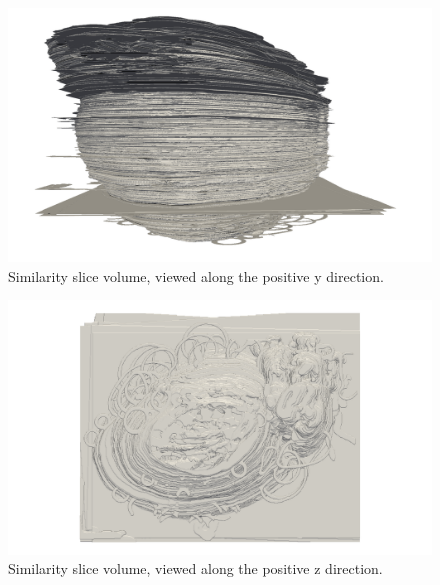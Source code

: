 	\begin{figure}
	  \centering
	  \includegraphics[width=0.9\textheight]{Ch7/Figs/Rat28/contours/whole_positive_y_size}
	  \caption{Similarity slice volume, viewed along the positive y direction.}
	  \label{fig:positive_y_similarity_contour}
	\end{figure}

	\begin{figure}
	  \centering
	  \includegraphics[width=0.9\textheight]{Ch7/Figs/Rat28/contours/whole_positive_z_size}
	  \caption{Similarity slice volume, viewed along the positive z direction.}
	  \label{fig:positive_z_similarity_contour}
	\end{figure}

